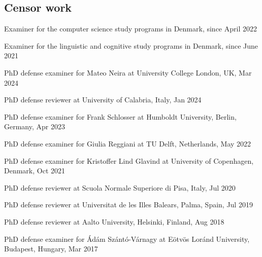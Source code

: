 \documentclass[10pt,a4paper]{article}
\renewenvironment{itemize}{
  \begin{list}{}{
    \setlength{\leftmargin}{1.5em}
    \setlength{\itemsep}{0.25em}
    \setlength{\parskip}{0pt}
    \setlength{\parsep}{0.25em}
  }
}{
  \end{list}
}
\begin{document}
\subsection*{Censor work}
\begin{itemize} 
\item{Examiner for the computer science study programs in Denmark, since April 2022}
\item{Examiner for the linguistic and cognitive study programs in Denmark, since June 2021}
\item{PhD defense examiner for Mateo Neira at University College London, UK, Mar 2024}
\item{PhD defense reviewer at University of Calabria, Italy, Jan 2024}
\item{PhD defense examiner for Frank Schlosser at Humboldt University, Berlin, Germany, Apr 2023}
\item{PhD defense examiner for Giulia Reggiani at TU Delft, Netherlands, May 2022}
\item{PhD defense examiner for Kristoffer Lind Glavind at University of Copenhagen, Denmark, Oct 2021}
\item{PhD defense reviewer at Scuola Normale Superiore di Pisa, Italy, Jul 2020}
\item{PhD defense reviewer at Universitat de les Illes Balears, Palma, Spain, Jul 2019}
\item{PhD defense reviewer at Aalto University, Helsinki, Finland, Aug 2018}
\item{PhD defense examiner for Ádám Szántó-Várnagy at E{\"o}tv{\"o}s Lor{\'a}nd University, Budapest, Hungary, Mar 2017}
\end{itemize}
\end{document}
